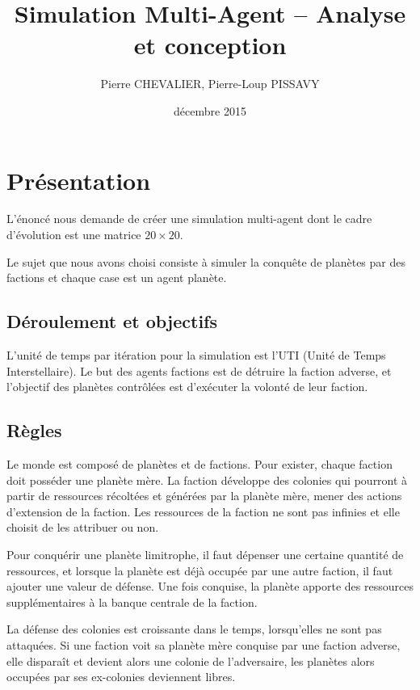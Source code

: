 \documentclass{article}
\title{Simulation Multi-Agent -- Analyse et conception}
\author{Pierre CHEVALIER, Pierre-Loup PISSAVY}
\date{décembre 2015}
\begin{document}
  \maketitle
  \setlength{\parskip}{10pt}

  \section{Présentation}

    L'énoncé nous demande de créer une simulation multi-agent dont le cadre d'évolution est une matrice $20 \times 20$.

    Le sujet que nous avons choisi consiste à simuler la conquête de planètes par des factions et chaque case est un agent planète.

    \subsection{Déroulement et objectifs}

    L'unité de temps par itération pour la simulation est l'UTI (Unité de Temps Interstellaire). Le but des agents factions est de détruire la faction adverse, et l'objectif des planètes contrôlées est d'exécuter la volonté de leur faction.

    \subsection{Règles}
    Le monde est composé de planètes et de factions. Pour exister, chaque faction doit posséder une planète mère. La faction développe des colonies qui pourront à partir de ressources récoltées et générées par la planète mère, mener des actions d'extension de la faction. Les ressources de la faction ne sont pas infinies et elle choisit de les attribuer ou non.
  
    Pour conquérir une planète limitrophe, il faut dépenser une certaine quantité de ressources, et lorsque la planète est déjà occupée par une autre faction, il faut ajouter une valeur de défense. Une fois conquise, la planète apporte des ressources supplémentaires à la banque centrale de la faction.

    La défense des colonies est croissante dans le temps, lorsqu'elles ne sont pas attaquées. Si une faction voit sa planète mère conquise par une faction adverse, elle disparaît et devient alors une colonie de l'adversaire, les planètes alors occupées par ses ex-colonies deviennent libres. 
\end{document}

